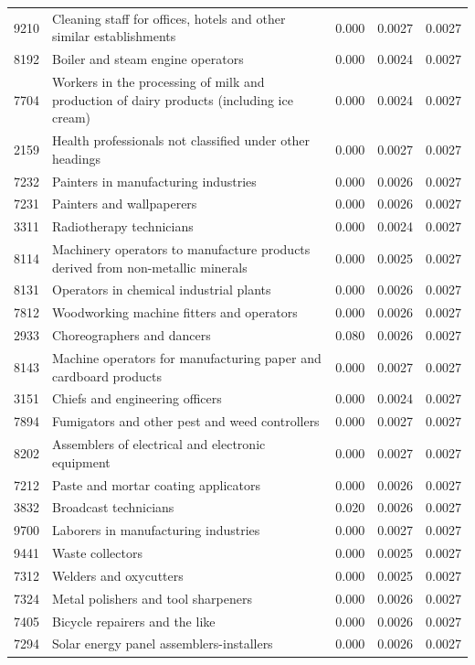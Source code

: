 \begin{longtable}{p{}>{\raggedright\arraybackslash}p{}rrr}
9210 & Cleaning staff for offices, hotels and other similar establishments & 0.000 & 0.0027 & 0.0027 \\
8192 & Boiler and steam engine operators & 0.000 & 0.0024 & 0.0027 \\
7704 & Workers in the processing of milk and production of dairy products (including ice cream) & 0.000 & 0.0024 & 0.0027 \\
2159 & Health professionals not classified under other headings & 0.000 & 0.0027 & 0.0027 \\
7232 & Painters in manufacturing industries & 0.000 & 0.0026 & 0.0027 \\
7231 & Painters and wallpaperers & 0.000 & 0.0026 & 0.0027 \\
3311 & Radiotherapy technicians & 0.000 & 0.0024 & 0.0027 \\
8114 & Machinery operators to manufacture products derived from non-metallic minerals & 0.000 & 0.0025 & 0.0027 \\
8131 & Operators in chemical industrial plants & 0.000 & 0.0026 & 0.0027 \\
7812 & Woodworking machine fitters and operators & 0.000 & 0.0026 & 0.0027 \\
2933 & Choreographers and dancers & 0.080 & 0.0026 & 0.0027 \\
8143 & Machine operators for manufacturing paper and cardboard products & 0.000 & 0.0027 & 0.0027 \\
3151 & Chiefs and engineering officers & 0.000 & 0.0024 & 0.0027 \\
7894 & Fumigators and other pest and weed controllers & 0.000 & 0.0027 & 0.0027 \\
8202 & Assemblers of electrical and electronic equipment & 0.000 & 0.0027 & 0.0027 \\
7212 & Paste and mortar coating applicators & 0.000 & 0.0026 & 0.0027 \\
3832 & Broadcast technicians & 0.020 & 0.0026 & 0.0027 \\
9700 & Laborers in manufacturing industries & 0.000 & 0.0027 & 0.0027 \\
9441 & Waste collectors & 0.000 & 0.0025 & 0.0027 \\
7312 & Welders and oxycutters & 0.000 & 0.0025 & 0.0027 \\
7324 & Metal polishers and tool sharpeners & 0.000 & 0.0026 & 0.0027 \\
7405 & Bicycle repairers and the like & 0.000 & 0.0026 & 0.0027 \\
7294 & Solar energy panel assemblers-installers & 0.000 & 0.0026 & 0.0027 \\

\end{longtable}
